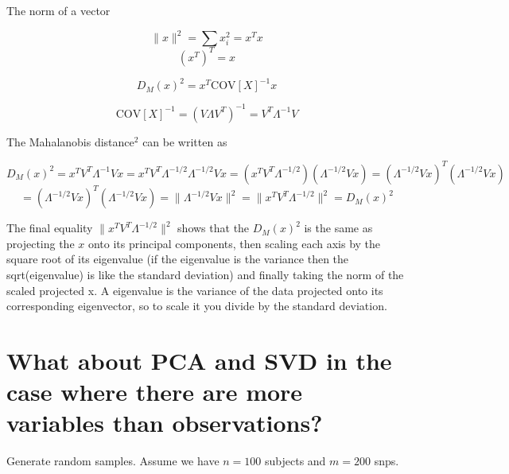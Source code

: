 \documentclass[]{article}
\begin{document}
The norm of a vector

\begin{equation}
\lVert x \rVert^2 = \sum{x_i^2} = x^Tx
\end{equation}\begin{equation}
(x^T)^T = x
\end{equation}

\begin{equation}
D_{M}(x)^2 = x^T \text{COV}[X]^{-1} x
\end{equation}

\begin{equation}
\text{COV}[X]^{-1} = (V \Lambda V^T )^{-1} = V^T \Lambda^{-1} V
\end{equation}

The Mahalanobis distance\(^2\) can be written as

\begin{equation}
D_{M}(x)^2 = x^T V^T \Lambda^{-1} V x =  x^T V^T \Lambda^{-1/2}  \Lambda^{-1/2} V x = (x^T V^T \Lambda^{-1/2})  (\Lambda^{-1/2} V x) = (\Lambda^{-1/2} V x)^T (\Lambda^{-1/2} V x)
\end{equation}\begin{equation}
= (\Lambda^{-1/2} V x)^T (\Lambda^{-1/2} V x) = \lVert \Lambda^{-1/2} V x \rVert^2 = \lVert x^T V^T \Lambda^{-1/2} \rVert^2 = D_{M}(x)^2 
\end{equation}

The final equality \(\lVert x^T V^T \Lambda^{-1/2} \rVert^2\) shows that
the \(D_{M}(x)^2\) is the same as projecting the \(x\) onto its
principal components, then scaling each axis by the square root of its
eigenvalue (if the eigenvalue is the variance then the sqrt(eigenvalue)
is like the standard deviation) and finally taking the norm of the
scaled projected x. A eigenvalue is the variance of the data projected
onto its corresponding eigenvector, so to scale it you divide by the
standard deviation.

\section{What about PCA and SVD in the case where there are more
variables than
observations?}\label{what-about-pca-and-svd-in-the-case-where-there-are-more-variables-than-observations}

Generate random samples. Assume we have \(n=100\) subjects and \(m=200\)
snps.
\end{document}
